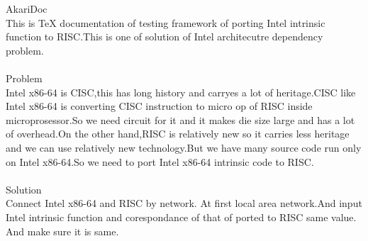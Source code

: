 \documentclass[dvipdfmx]{jsarticle}
\begin{document}
AkariDoc\\
This is TeX documentation of testing framework of porting Intel intrinsic function to RISC.This is one of solution of Intel architecutre dependency problem.\\
\\
Problem\\
Intel x86-64 is CISC,this has long history and carryes a lot of heritage.CISC like Intel x86-64 is converting CISC instruction to micro op of RISC inside microprosessor.So we need circuit for it and it makes die size large and has a lot of overhead.On the other hand,RISC is relatively new so it carries less heritage and we can use relatively new technology.But we have many source code run only on Intel x86-64.So we need to port Intel x86-64 intrinsic code to RISC.\\
\\
Solution\\
Connect Intel x86-64 and RISC by network. At first local area network.And input Intel intrinsic function and corespondance of that of ported to RISC same value. And make sure it is same.\\
\\
\end{document}

